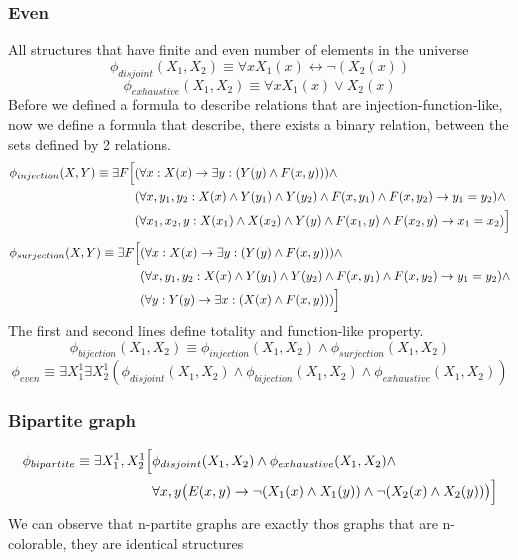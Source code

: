 \documentclass{article}
\begin{document}
\subsubsection{Even}
All structures that have finite and even number of elements in the universe
\[\phi_{disjoint}(X_1, X_2) \equiv \forall x X_1(x) \leftrightarrow \neg (X_2(x))\] 
\[\phi_{exhaustive}(X_1, X_2) \equiv \forall x X_1(x) \lor X_2(x)\]
Before we defined a formula to describe relations that are injection-function-like, now we define a formula that describe, there exists a binary relation, between the sets defined by 2 relations.
$$\begin{aligned}
\phi_{injection}(X, Y) \equiv \exists F \Bigl[
& (\forall x : X(x) \rightarrow \exists y : (Y(y) \land F(x, y))) \land \\
& (\forall x, y_1, y_2 : X(x) \land Y(y_1) \land Y(y_2) \land F(x, y_1) \land F(x, y_2) \rightarrow y_1 = y_2) \land \\
& (\forall x_1, x_2, y : X(x_1) \land X(x_2) \land Y(y) \land F(x_1, y) \land F(x_2, y) \rightarrow x_1 = x_2) \Bigr]
\end{aligned}$$
$$\begin{aligned}
\phi_{surjection}(X, Y) \equiv \exists F \Bigl[ 
& (\forall x : X(x) \rightarrow \exists y : (Y(y) \land F(x, y))) \land \\
& (\forall x, y_1, y_2 : X(x) \land Y(y_1) \land Y(y_2) \land F(x, y_1) \land F(x, y_2) \rightarrow y_1 = y_2) \land \\
& (\forall y : Y(y) \rightarrow \exists x : (X(x) \land F(x, y))) \Bigr]
\end{aligned}$$
The first and second lines define totality and function-like property.
\[\phi_{bijection}(X_1, X_2) \equiv \phi_{injection}(X_1, X_2) \land \phi_{surjection}(X_1, X_2)\]
\[\phi_{even} \equiv \exists X^1_1 \exists X^1_2 (\phi_{disjoint}(X_1, X_2) \land \phi_{bijection}(X_1, X_2) \land \phi_{exhaustive}(X_1, X_2))\]


\subsubsection{Bipartite graph}
$$\begin{aligned}
\phi_{bipartite} \equiv \exists X_1^1, X_2^1 \Bigl[ & \phi_{disjoint}(X_1, X_2) \land \phi_{exhaustive}(X_1, X_2) \land \\
& \forall x, y \bigl( E(x, y) \rightarrow \neg(X_1(x) \land X_1(y)) \land \neg(X_2(x) \land X_2(y)) \bigr) \Bigr]
\end{aligned}$$
We can observe that n-partite graphs are exactly thos graphs that are n-colorable, they are identical structures
\end{document}

